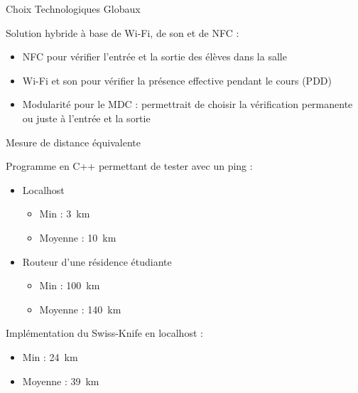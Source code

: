 \documentclass[aspectratio=169]{beamer}
\begin{document}
\begin{frame}{Choix Technologiques Globaux}

  Solution hybride à base de Wi-Fi, de son et de NFC :
  \begin{itemize}
      \item NFC pour vérifier l'entrée et la sortie des élèves dans la salle
      \item Wi-Fi et son pour vérifier la présence effective pendant le cours (PDD)
      \item Modularité pour le MDC : permettrait de choisir la vérification permanente ou juste à l'entrée et la sortie
  \end{itemize}
  
\end{frame}
  
\begin{frame}{Mesure de distance équivalente}
          
      Programme en C++ permettant de tester avec un ping :
      \begin{itemize}
          \item Localhost
          \begin{itemize}
              \item Min : \SI{3}{\kilo\meter} 
              \item Moyenne : \SI{10}{\kilo\meter} 
          \end{itemize}
          \item Routeur d'une résidence étudiante
          \begin{itemize}
              \item Min : \SI{100}{\kilo\meter} 
              \item Moyenne : \SI{140}{\kilo\meter} 
          \end{itemize}
      \end{itemize}

      \bigskip

      Implémentation du Swiss-Knife en localhost :
      \begin{itemize}
          \item Min : \SI{24}{\kilo\meter} 
          \item Moyenne : \SI{39}{\kilo\meter} 
      \end{itemize}
  
\end{frame}
\end{document}
